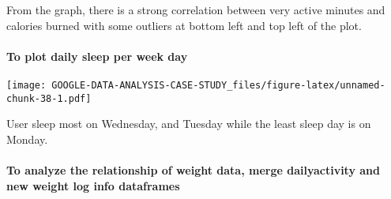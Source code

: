 \documentclass[
]{article}
\newenvironment{Shaded}{\begin{snugshade}}{\end{snugshade}}
\newcommand{\AttributeTok}[1]{\textcolor[rgb]{0.77,0.63,0.00}{#1}}
\newcommand{\CommentTok}[1]{\textcolor[rgb]{0.56,0.35,0.01}{\textit{#1}}}
\newcommand{\FunctionTok}[1]{\textcolor[rgb]{0.00,0.00,0.00}{#1}}
\newcommand{\NormalTok}[1]{#1}
\newcommand{\OtherTok}[1]{\textcolor[rgb]{0.56,0.35,0.01}{#1}}
\newcommand{\SpecialCharTok}[1]{\textcolor[rgb]{0.00,0.00,0.00}{#1}}
\newcommand{\StringTok}[1]{\textcolor[rgb]{0.31,0.60,0.02}{#1}}
\begin{document}
From the graph, there is a strong correlation between very active
minutes and calories burned with some outliers at bottom left and top
left of the plot.

\hypertarget{to-plot-daily-sleep-per-week-day}{%
\paragraph{To plot daily sleep per week
day}\label{to-plot-daily-sleep-per-week-day}}

\begin{Shaded}
\end{Shaded}

\texttt{[image: GOOGLE-DATA-ANALYSIS-CASE-STUDY\_files/figure-latex/unnamed-chunk-38-1.pdf]}

User sleep most on Wednesday, and Tuesday while the least sleep day is
on Monday.

\hypertarget{to-analyze-the-relationship-of-weight-data-merge-dailyactivity-and-new-weight-log-info-dataframes}{%
\paragraph{To analyze the relationship of weight data, merge
dailyactivity and new weight log info
dataframes}\label{to-analyze-the-relationship-of-weight-data-merge-dailyactivity-and-new-weight-log-info-dataframes}}
\end{document}
